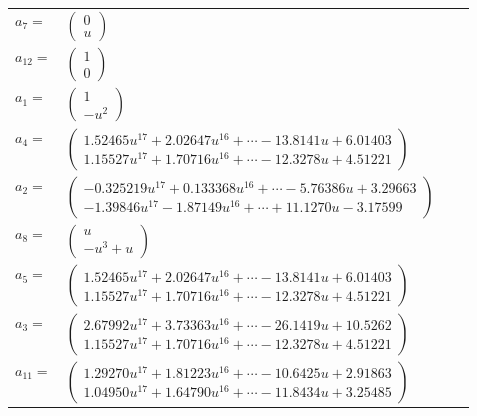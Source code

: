 \documentclass[1p]{elsarticle_modified}
\theoremstyle{definition}
\begin{document}
\begin{tabular}{m{7pt} m{180pt} m{7pt} m{180pt} }
\flushright $a_{7}=$&$\begin{pmatrix}0\\u\end{pmatrix}$ \\
\flushright $a_{12}=$&$\begin{pmatrix}1\\0\end{pmatrix}$ \\
\flushright $a_{1}=$&$\begin{pmatrix}1\\- u^2\end{pmatrix}$ \\
\flushright $a_{4}=$&$\begin{pmatrix}1.52465 u^{17}+2.02647 u^{16}+\cdots-13.8141 u+6.01403\\1.15527 u^{17}+1.70716 u^{16}+\cdots-12.3278 u+4.51221\end{pmatrix}$ \\
\flushright $a_{2}=$&$\begin{pmatrix}-0.325219 u^{17}+0.133368 u^{16}+\cdots-5.76386 u+3.29663\\-1.39846 u^{17}-1.87149 u^{16}+\cdots+11.1270 u-3.17599\end{pmatrix}$ \\
\flushright $a_{8}=$&$\begin{pmatrix}u\\- u^3+u\end{pmatrix}$ \\
\flushright $a_{5}=$&$\begin{pmatrix}1.52465 u^{17}+2.02647 u^{16}+\cdots-13.8141 u+6.01403\\1.15527 u^{17}+1.70716 u^{16}+\cdots-12.3278 u+4.51221\end{pmatrix}$ \\
\flushright $a_{3}=$&$\begin{pmatrix}2.67992 u^{17}+3.73363 u^{16}+\cdots-26.1419 u+10.5262\\1.15527 u^{17}+1.70716 u^{16}+\cdots-12.3278 u+4.51221\end{pmatrix}$ \\
\flushright $a_{11}=$&$\begin{pmatrix}1.29270 u^{17}+1.81223 u^{16}+\cdots-10.6425 u+2.91863\\1.04950 u^{17}+1.64790 u^{16}+\cdots-11.8434 u+3.25485\end{pmatrix}$ \\

\end{tabular}
\end{document}
